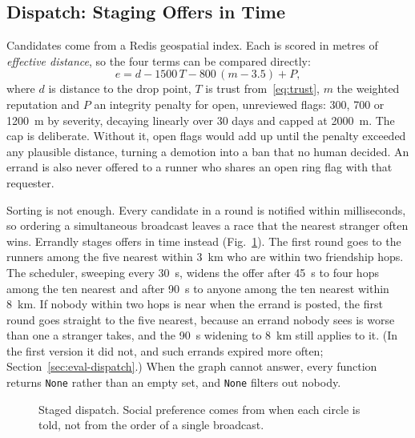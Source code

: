 \documentclass[journal]{IEEEtran}
\newcommand{\code}[1]{\texttt{#1}}
\begin{document}
\subsection{Dispatch: Staging Offers in Time}\label{sec:design-dispatch}
Candidates come from a Redis geospatial index. Each is scored in metres of
\emph{effective distance}, so the four terms can be compared directly:
\begin{equation}
e = d - 1500\,T - 800\,(m-3.5) + P, \label{eq:effective}
\end{equation}
where $d$ is distance to the drop point, $T$ is trust from~\eqref{eq:trust}, $m$ the
weighted reputation and $P$ an integrity penalty for open, unreviewed flags: 300, 700
or 1200~m by severity, decaying linearly over 30 days and capped at 2000~m. The cap is
deliberate. Without it, open flags would add up until the penalty exceeded any
plausible distance, turning a demotion into a ban that no human decided. An errand is
also never offered to a runner who shares an open ring flag with that requester.

Sorting is not enough. Every candidate in a round is notified within milliseconds,
so ordering a simultaneous broadcast leaves a race that the nearest stranger often
wins. Errandly stages offers in time instead (Fig.~\ref{fig:dispatch}). The first
round goes to the runners among the five nearest within 3~km who are within two
friendship hops. The scheduler, sweeping every 30~s, widens the offer after 45~s to
four hops among the ten nearest and after 90~s to anyone among the ten nearest within
8~km. If nobody within two hops is near when the errand is posted, the first round
goes straight to the five nearest, because an errand nobody sees is worse than one a
stranger takes, and the 90~s widening to 8~km still applies to it. (In the first
version it did not, and such errands expired more often; Section~\ref{sec:eval-dispatch}.) When the graph cannot answer, every function returns \code{None}
rather than an empty set, and \code{None} filters out nobody.

\begin{figure}[!t]
\centering

\caption{Staged dispatch. Social preference comes from when each circle is told,
not from the order of a single broadcast.}
\label{fig:dispatch}
\end{figure}
\end{document}
